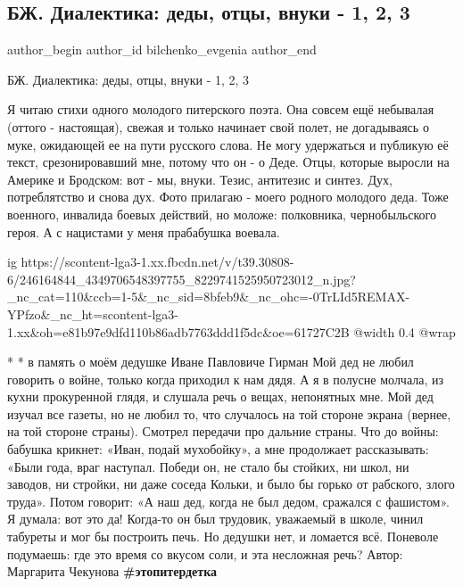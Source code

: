  
 
 
 
 
 
\subsection{БЖ. Диалектика: деды, отцы, внуки - 1, 2, 3}
\label{sec:16_10_2021.fb.bilchenko_evgenia.1.dialektika_otcy_vnuki_deti}
 
\ifcmt
 author_begin
   author_id bilchenko_evgenia
 author_end
\fi

БЖ. Диалектика: деды, отцы, внуки - 1, 2, 3

Я читаю стихи одного молодого питерского поэта. Она совсем ещё небывалая
(оттого - настоящая), свежая и только начинает свой полет, не догадываясь о
муке, ожидающей ее на пути русского слова. Не могу удержаться и публикую её
текст, срезонировавший мне, потому что он - о Деде. Отцы, которые выросли на
Америке и Бродском: вот - мы, внуки. Тезис, антитезис и синтез. Дух,
потреблятство и снова дух. Фото прилагаю - моего родного молодого деда. Тоже
военного, инвалида боевых действий, но моложе: полковника, чернобыльского
героя. А с нацистами у меня прабабушка воевала. 

\ifcmt
  ig https://scontent-lga3-1.xx.fbcdn.net/v/t39.30808-6/246164844_4349706548397755_8229741525950723012_n.jpg?_nc_cat=110&ccb=1-5&_nc_sid=8bfeb9&_nc_ohc=-0TrLId5REMAX-YPfzo&_nc_ht=scontent-lga3-1.xx&oh=e81b97e9dfd110b86adb7763ddd1f5dc&oe=61727C2B
  @width 0.4
  @wrap 
\fi

 * *
в память о моём дедушке Иване Павловиче Гирман
Мой дед не любил говорить о войне,
только когда приходил к нам дядя.
А я в полусне
молчала, из кухни прокуренной глядя,
и слушала речь о вещах, непонятных мне.
Мой дед
изучал все газеты, но не любил
то, что случалось на той стороне экрана
(вернее, на той стороне страны).
Смотрел передачи про дальние страны.
Что до войны:
бабушка крикнет: «Иван, подай мухобойку»,
а мне продолжает рассказывать:
«Были года,
враг наступал. Победи он,
не стало бы стойких,
ни школ, ни заводов, ни стройки,
ни даже соседа Кольки,
и было бы горько от рабского, злого труда».
Потом говорит: 
«А наш дед, когда не был дедом, 
сражался с фашистом».
Я думала: вот это да!
Когда-то он был трудовик, уважаемый в школе,
чинил табуреты и мог бы построить печь.
Но дедушки нет, и ломается всё.
Поневоле
подумаешь: где это время со вкусом соли,
и эта несложная  речь?
Автор: Маргарита Чекунова
\textbf{\#этопитердетка}
